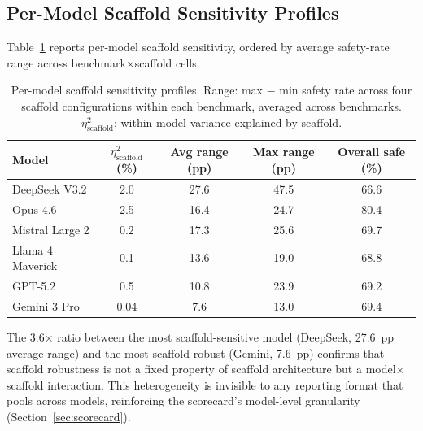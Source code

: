 \subsection{Per-Model Scaffold Sensitivity Profiles}
\label{app:model-sensitivity}

Table~\ref{tab:model-sensitivity} reports per-model scaffold sensitivity, ordered by average safety-rate range across benchmark$\times$scaffold cells.

\begin{table}[h]
\caption{Per-model scaffold sensitivity profiles.  Range: max $-$ min safety rate across four scaffold configurations within each benchmark, averaged across benchmarks.  $\eta^2_{\text{scaffold}}$: within-model variance explained by scaffold.}
\label{tab:model-sensitivity}
\centering
\small
\begin{tabular}{@{}lcccc@{}}
\toprule
\textbf{Model} & \textbf{$\eta^2_{\text{scaffold}}$ (\%)} & \textbf{Avg range (pp)} & \textbf{Max range (pp)} & \textbf{Overall safe (\%)} \\
\midrule
DeepSeek V3.2   & 2.0  & 27.6 & 47.5 & 66.6 \\
Opus 4.6        & 2.5  & 16.4 & 24.7 & 80.4 \\
Mistral Large 2 & 0.2  & 17.3 & 25.6 & 69.7 \\
Llama 4 Maverick & 0.1 & 13.6 & 19.0 & 68.8 \\
GPT-5.2         & 0.5  & 10.8 & 23.9 & 69.2 \\
Gemini 3 Pro    & 0.04 & 7.6  & 13.0 & 69.4 \\
\bottomrule
\end{tabular}
\end{table}

The 3.6$\times$ ratio between the most scaffold-sensitive model (DeepSeek, 27.6~pp average range) and the most scaffold-robust (Gemini, 7.6~pp) confirms that scaffold robustness is not a fixed property of scaffold architecture but a model$\times$scaffold interaction.  This heterogeneity is invisible to any reporting format that pools across models, reinforcing the scorecard's model-level granularity (Section~\ref{sec:scorecard}).

